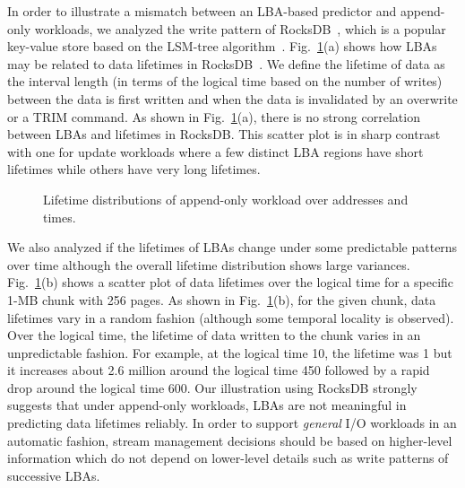 In order to illustrate a mismatch between an LBA-based predictor and 
append-only workloads, we analyzed the write pattern of 
RocksDB~\cite{RocksDB}, which is a
popular key-value store based on the LSM-tree algorithm~\cite{LSM}.
Fig.~\ref{fig:lba_lifetime}(a) shows how LBAs may be related 
to data lifetimes in RocksDB~\cite{RocksDB}.  
{\color{blue}
We define the lifetime of data as the interval length (in terms of
the logical time based on the number of writes) between
the data is first written and when the data is invalidated
by an overwrite or a TRIM command.
}
As shown in Fig.~\ref{fig:lba_lifetime}(a), 
there is no strong correlation between LBAs and lifetimes in RocksDB.  
This scatter plot is in sharp contrast with one for update workloads 
where a few distinct LBA regions have short lifetimes while others 
have very long lifetimes.

\begin{figure}[t]
	\centering
	\hfill
	\hspace{10pt}
	\caption{Lifetime distributions of append-only workload over addresses and times.} %
	\label{fig:lba_lifetime}
\end{figure}


We also analyzed 
if the lifetimes of LBAs change under some predictable patterns over time 
although the overall lifetime distribution shows large variances.
Fig.~\ref{fig:lba_lifetime}(b) shows a scatter plot of data lifetimes over the logical time 
for a specific 1-MB chunk with 256 pages. 
As shown in Fig.~\ref{fig:lba_lifetime}(b), 
for the given chunk, data lifetimes vary in a random fashion
(although some temporal locality is observed).
Over the logical time, the lifetime of data written to the chunk 
varies in an unpredictable fashion.  
For example, at the logical time 10, the lifetime was 1 but it increases about 
2.6 million around the logical time 450 
followed by a rapid drop around the logical time 600. 
Our illustration using RocksDB strongly suggests that under append-only workloads, 
{\color{blue}LBAs are not meaningful in predicting data lifetimes reliably.
In order to support {\it general} I/O workloads in an automatic fashion, stream 
management decisions should be based on higher-level information
which do not depend on lower-level details such as write patterns of successive LBAs.
}

